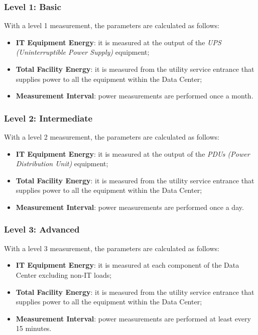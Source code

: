 \subsubsection{Level 1: Basic}
With a level 1 measurement, the parameters are calculated as follows:
\begin{itemize}
    \item \textbf{IT Equipment Energy}: it is measured at the output of the \emph{UPS (Uninterruptible Power Supply)} equipment;
    \item \textbf{Total Facility Energy}: it is measured from the utility service entrance that supplies power to all the equipment within the Data Center;
    \item \textbf{Measurement Interval}: power measurements are performed once a month.
\end{itemize}

\subsubsection{Level 2: Intermediate}
With a level 2 measurement, the parameters are calculated as follows:
\begin{itemize}
    \item \textbf{IT Equipment Energy}: it is measured at the output of the \emph{PDUs (Power Distribution Unit)} equipment;
    \item \textbf{Total Facility Energy}: it is measured from the utility service entrance that supplies power to all the equipment within the Data Center;    
    \item \textbf{Measurement Interval}: power measurements are performed once a day.
\end{itemize}

\subsubsection{Level 3: Advanced}
With a level 3 measurement, the parameters are calculated as follows:
\begin{itemize}
    \item \textbf{IT Equipment Energy}: it is measured at each component of the Data Center excluding non-IT loads;
    \item \textbf{Total Facility Energy}: it is measured from the utility service entrance that supplies power to all the equipment within the Data Center;    
    \item \textbf{Measurement Interval}: power measurements are performed at least every 15 minutes.
\end{itemize}

